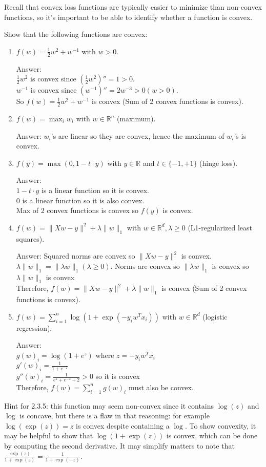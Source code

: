 \documentclass{article}
\newcommand{\blu}[1]{{\textcolor{blu}{#1}}}
\newcommand{\gre}[1]{\textcolor{gre}{#1}}
\newcommand\ans[1]{\par\gre{Answer: #1}}
\def\R{\mathbb{R}}
\def\half{\frac 1 2}
\newcommand{\norm}[1]{\lVert #1 \rVert}
\begin{document}
Recall that convex loss functions are typically easier to minimize than non-convex functions, so it's important to be able to identify whether a function is convex.

\blu{Show that the following functions are convex}:

\begin{enumerate}
\item $f(w) = \half w^2 + w^{-1}$ with $w > 0$.
\ans{\\
$\half w^2$ is convex since $(\half w^2)'' = 1 > 0$. \\
$w^{-1}$ is convex since $(w^{-1})'' = 2w^{-3} > 0 (w>0) $. \\
So $f(w) = \half w^2 + w^{-1}$ is convex (Sum of 2 convex functions is convex).}
\item $f(w) = \max_i w_i$ with $w \in \R^n$ (maximum).
\ans{$w_i$'s are linear so they are convex, hence the maximum of $w_i$'s is convex.}
\item $f(y) = \max(0,1-t\cdot y)$ with $y\in \R$ and $t\in\{-1,+1\}$ (hinge loss).
\ans{\\$1-t\cdot y$ is a linear function so it is convex.\\
0 is a linear function so it is also convex.\\
Max of 2 convex functions is convex so $f(y)$ is convex.}
\item $f(w) = \norm{Xw-y}^2 + \lambda\norm{w}_1$ with $w \in \R^d, \lambda \geq 0$ (L1-regularized least squares).
\ans{Squared norms are convex so $\norm{Xw-y}^2$ is convex. \\
$\lambda\norm{w}_1 = \norm{\lambda w}_1 (\lambda \geq 0)$. Norms are convex so $\norm{\lambda w}_1$ is convex so $\lambda\norm{w}_1$ is convex\\
Therefore, $f(w) = \norm{Xw-y}^2 + \lambda\norm{w}_1$ is convex (Sum of 2 convex functions is convex).}
\item $f(w) = \sum_{i=1}^n \log(1+\exp(-y_iw^Tx_i)) $ with $w \in \R^d$ (logistic regression).
\ans{\\
$g(w)_i=\log(1+e^z)$ where $z=-y_iw^Tx_i$\\
$g'(w)_i=\frac{1}{1+e^{-z}}$\\
$g''(w)_i=\frac{1}{e^z+e^{-z}+2}>0$ so it is convex \\
Therefore, $f(w) = \sum_{i=1}^ng(w)_i$ must also be convex.}
\end{enumerate}



Hint for 2.3.5: this function may seem non-convex since it contains $\log(z)$ and $\log$ is concave, but there is a flaw in that reasoning: for example $\log(\exp(z))=z$ is convex despite containing a $\log$. To show convexity, it may be helpful to show that $\log(1+\exp(z))$ is convex, which can be done by computing the second derivative. It may simplify matters to note that $\frac{\exp(z)}{1+\exp(z)} = \frac{1}{1+\exp(-z)}$.
\end{document}
